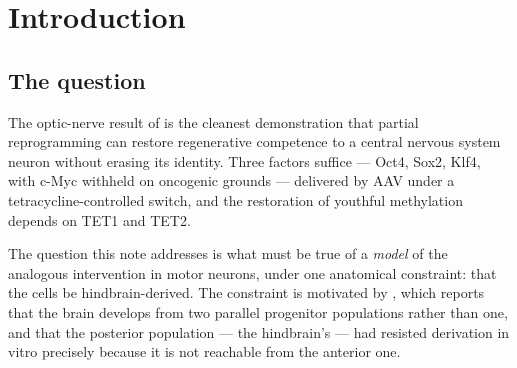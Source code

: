 \documentclass[11pt,a4paper]{article}
\theoremstyle{plain}
\theoremstyle{definition}
\theoremstyle{remark}
\newcommand{\dok}{\textsf{do}}
\begin{document}
\begin{abstract}
Fourth, the proofreading ladder yields a limitative result with an immediate
experimental consequence. Pulsed induction is proofreading in time, its
advantage over sustained induction scales as a power of the single-stage
discrimination factor $f$ at the contested loci, and the exponent is
independent of the number of pulses. Since energy buys confidence and never
scope \cite{Proofreading}, no schedule manufactures selectivity that the OSK
affinity landscape does not already supply. Measuring $f$ on
hPSC-derived hindbrain motor neurons is therefore a go/no-go test that
precedes animal work and costs a binding assay rather than a cohort.

Four places where the apparatus is not ready are recorded rather than
smoothed over: the pluripotency network's variable-level cycles, the
permanent-shaped normalisation of a well-mixed cell's contention sets,
structural identifiability, and the discipline required to distinguish a
biologically real starvation from an over-restricted $\dok$. We close with
what the model can and cannot license. Its job is to say which experiments to
run and which protocol variants to discard --- not which protocol to use.
\end{abstract}

\tableofcontents

\section{Introduction}\label{sec:intro}

\subsection{The question}

The optic-nerve result of \cite{LuEtAl} is the cleanest demonstration that
partial reprogramming can restore regenerative competence to a central nervous
system neuron without erasing its identity. Three factors suffice --- Oct4,
Sox2, Klf4, with c-Myc withheld on oncogenic grounds --- delivered by AAV under
a tetracycline-controlled switch, and the restoration of youthful methylation
depends on TET1 and TET2.

The question this note addresses is what must be true of a \emph{model} of the
analogous intervention in motor neurons, under one anatomical constraint: that
the cells be hindbrain-derived. The constraint is motivated by
\cite{TwoOrgans}, which reports that the brain develops from two parallel
progenitor populations rather than one, and that the posterior population ---
the hindbrain's --- had resisted derivation in vitro precisely because it is
not reachable from the anterior one.
\end{document}
